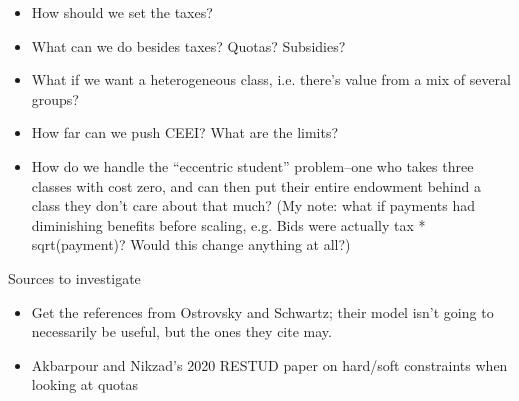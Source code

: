 \documentclass{article}
\begin{document}
\begin{itemize}
    \item How should we set the taxes?
    
    \item What can we do besides taxes? Quotas? Subsidies?
    
    \item What if we want a heterogeneous class, i.e. there's value from a mix of several groups?
    
    \item How far can we push CEEI? What are the limits?
    
    \item How do we handle the ``eccentric student'' problem--one who takes three classes with cost zero, and can then put their entire endowment behind a class they don't care about that much? (My note: what if payments had diminishing benefits before scaling, e.g. Bids were actually tax * sqrt(payment)? Would this change anything at all?)
\end{itemize}

Sources to investigate

\begin{itemize}
    \item Get the references from Ostrovsky and Schwartz; their model isn't going to necessarily be useful, but the ones they cite may.
    
    \item Akbarpour and Nikzad's 2020 RESTUD paper on hard/soft constraints when looking at quotas
\end{itemize}
\end{document}
